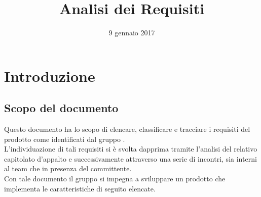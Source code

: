 


\author{\ALL}
\supervisor{\ALL}
\dest{\TV, \RC, \ZU}
\title{Analisi dei Requisiti}
\date{9 gennaio 2017}


\maketitle

\tableofcontents
\listoffigures

\newpage

\newcommand{\myimg}[1]
{

\begin{figure}[H]
\makebox[\textwidth][c]
{
\texttt{[image: Diagrammi casi d'uso/\#1]}
}
\caption{#1}
\label{#1}
\end{figure}

}

\newcommand{\myimgsmall}[1]
{

\begin{figure}[H]
\makebox[\textwidth][c]
{
\texttt{[image: Diagrammi casi d'uso/\#1]}
}
\caption{#1}
\label{#1}
\end{figure}

}

\newcommand{\myimgvsmall}[1]
{

\begin{figure}[H]
\makebox[\textwidth][c]
{
\texttt{[image: Diagrammi casi d'uso/\#1]}
}
\caption{#1}
\label{#1}
\end{figure}

}


\section{Introduzione}
	\subsection{Scopo del documento}
	Questo documento ha lo scopo di elencare, classificare e tracciare i requisiti del prodotto \proj{} come identificati dal gruppo \hx{}. 
	\\L'individuazione di tali requisiti si è svolta dapprima tramite l'analisi del relativo capitolato d'appalto e successivamente attraverso una serie di incontri, sia interni al team che in presenza del committente.
	\\Con tale documento il gruppo \hx{} si impegna a sviluppare un prodotto che implementa le caratteristiche di seguito elencate.


